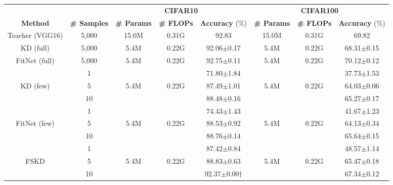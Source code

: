 \documentclass[letterpaper]{article} %
\begin{document}
{{
    \begin{table}[ht]
    \centering
    \begin{threeparttable}
    {
        \begin{tabular}{c|c|ccc|ccc}
        \hline
        \multicolumn{1}{c|}{} & \multicolumn{1}{c|}{}    & \multicolumn{3}{c|}{\textbf{CIFAR10}}  & \multicolumn{3}{c}{\textbf{CIFAR100}}\\
        \textbf{Method} & \textbf{\# Samples} & \textbf{\# Params} & \textbf{\# FLOPs} & \textbf{Accuracy} (\%) & \textbf{\# Params} & \textbf{\# FLOPs} & \textbf{Accuracy} (\%)\\
        \hline
        Teacher (VGG16)
                & 5,000 & 15.0M   & 0.31G   & 92.83                   & 15.0M   & 0.31G   & 69.82 \\
        KD (full)
                & 5,000 & 5.4M    & 0.22G   & 92.06$\pm$0.17          & 5.4M    & 0.22G   & 68.31$\pm$0.15\\
        FitNet (full)
                & 5,000 & 5.4M    & 0.22G   & 92.75$\pm$0.11          & 5.4M    & 0.22G   & 70.12$\pm$0.12\\
        \hline
                & 1     &         &         & 71.80$\pm$1.84          &         &         & 37.73$\pm$1.53 \\
        KD (few)
                & 5     & 5.4M    & 0.22G   & 87.49$\pm$1.01          & 5.4M    & 0.22G   & 64.03$\pm$0.06 \\
                & 10    &         &         & 88.48$\pm$0.16          &         &         & 65.27$\pm$0.17 \\
        \hline
                & 1     &         &         & 74.43$\pm$1.43          &         &         & 41.67$\pm$1.23 \\
        FitNet (few)
                & 5     & 5.4M    & 0.22G   & 88.53$\pm$0.92          & 5.4M    & 0.22G   & 64.13$\pm$0.34 \\
                & 10    &         &         & 88.76$\pm$0.14          &         &         & 65.64$\pm$0.15 \\
        \hline
                & 1     &         &         & 87.42$\pm$0.84          &         &         & 48.57$\pm$1.14 \\
        FSKD
                & 5     & 5.4M    & 0.22G   & 88.83$\pm$0.63          & 5.4M    & 0.22G   & 65.47$\pm$0.18 \\
                & 10    &         &         & 92.37$\pm$0.00$\dag$    &         &         & 67.34$\pm$0.12 \\

\end{tabular}}
\end{threeparttable}
\end{table}}}
\end{document}
